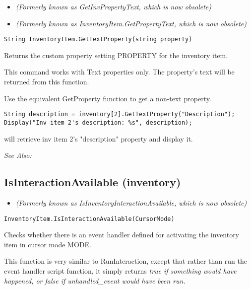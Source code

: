 \begin{itemize}
\item \it{(Formerly known as GetInvPropertyText, which is now obsolete)}
\item \it{(Formerly known as InventoryItem.GetPropertyText, which is now obsolete)}
\end{itemize}

\begin{verbatim}
String InventoryItem.GetTextProperty(string property)
\end{verbatim}
Returns the custom property setting PROPERTY for the inventory item.

This command works with Text properties only. The property's text will be
returned from this function.

Use the equivalent GetProperty function to get a non-text property.

\begin{verbatim}
String description = inventory[2].GetTextProperty("Description");
Display("Inv item 2's description: %s", description);
\end{verbatim}
will retrieve inv item 2's "description" property and display it.

\it{See Also:} 


\subsection{IsInteractionAvailable (inventory)}\label{InventoryItem.IsInteractionAvailable}%

\begin{itemize}
\item \it{(Formerly known as IsInventoryInteractionAvailable, which is now obsolete)}
\end{itemize}

\begin{verbatim}
InventoryItem.IsInteractionAvailable(CursorMode)
\end{verbatim}
Checks whether there is an event handler defined for activating the inventory item
in cursor mode MODE.

This function is very similar to RunInteraction, except that rather than run the event
handler script function, it simply returns \it{true} if something would have happened,
or \it{false} if unhandled_event would have been run.


